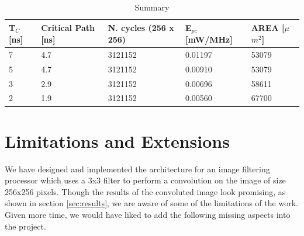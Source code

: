 \documentclass[11pt,a4paper]{article}
\begin{document}
\begin{table}[h]
	\caption{Summary}
	\begin{center}
		\begin{tabular}{|p{1cm}|p{2cm}|p{2cm}|l|l|} \hline
			\textbf{T}$_C$ [ns] & \textbf{Critical Path} [ns] & \textbf{N. cycles} (256 x 256) & \textbf{E}$_{pc}$ [mW/MHz] & \textbf{AREA} [$\mu$$m^2$] \\ \hline
			7 & 4.7 & 3121152 & 0.01197 & 53079 \\ \hline
			5 & 4.7 & 3121152 & 0.00910 & 53079 \\ \hline
			3 & 2.9 & 3121152 & 0.00696 & 58611 \\ \hline
			2 & 1.9 & 3121152 & 0.00560 & 67700 \\ \hline
		
		\end{tabular}
	\end{center}
	\label{tab:conclusion}
\end{table}


\section{Limitations and Extensions}
\label{sec:limitations}

We have designed and implemented the architecture for an image filtering processor which uses a 3x3 filter to perform a convolution on the image of size 256x256 pixels. Though the results of the convoluted image look promising, as shown in section \ref{sec:results}, we are aware of some of the limitations of the work. Given more time, we would have liked to add the following missing aspects into the project.
\end{document}
